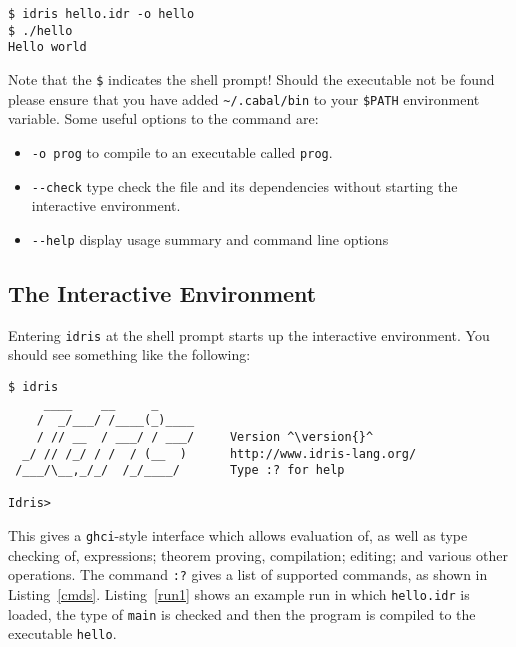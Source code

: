 \begin{lstlisting}[style=stdout]
$ idris hello.idr -o hello
$ ./hello
Hello world
\end{lstlisting}

\noindent
Note that the \texttt{\$} indicates the shell prompt!
Should the \Idris{} executable not be found please ensure that you have added \verb!~/.cabal/bin! to your \verb!$PATH! environment variable.
Some useful options to the \Idris{} command are:

\begin{itemize}
\item \verb!-o prog! to compile to an executable called \texttt{prog}.
\item \verb!--check! type check the file and its dependencies without starting the
interactive environment.
\item \verb!--help! display usage summary and command line options
\end{itemize}

\subsection{The Interactive Environment}

Entering \texttt{idris} at the shell prompt starts up the interactive environment.
You should see something like the following:

\begin{lstlisting}[style=stdout]
$ idris
     ____    __     _
    /  _/___/ /____(_)____
    / // __  / ___/ / ___/     Version ^\version{}^
  _/ // /_/ / /  / (__  )      http://www.idris-lang.org/
 /___/\__,_/_/  /_/____/       Type :? for help

Idris>
\end{lstlisting}

\noindent
This gives a \texttt{ghci}-style interface which allows evaluation of, as well as type checking of, expressions; theorem proving, compilation; editing; and various other operations.
The command \texttt{:?} gives a list of supported commands, as shown in Listing~\ref{cmds}.
Listing~\ref{run1} shows an example run in which \texttt{hello.idr} is loaded, the type of \texttt{main} is checked and then the program is compiled to the executable \texttt{hello}.

